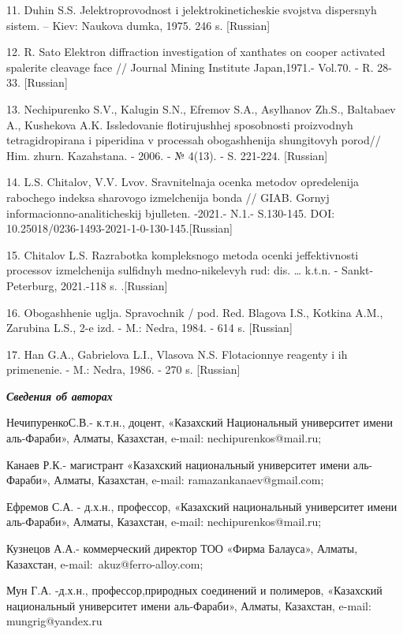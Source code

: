 \begin{noparindent}
11. Duhin S.S. Jelektroprovodnost\textquotesingle{} i
jelektrokineticheskie svojstva dispersnyh sistem. -- Kiev: Naukova
dumka, 1975. 246 s. {[}Russian{]}

12. R. Sato Elektron diffraction investigation of xanthates on cooper
activated spalerite cleavage face // Journal Mining Institute
Japan,1971.- Vol.70. - R. 28-33. {[}Russian{]}

13. Nechipurenko S.V., Kalugin S.N., Efremov S.A., Asylhanov Zh.S.,
Baltabaev A., Kushekova A.K. Issledovanie flotirujushhej sposobnosti
proizvodnyh tetragidropirana i piperidina v processah obogashhenija
shungitovyh porod// Him. zhurn. Kazahstana. - 2006. - № 4(13). - S.
221-224. {[}Russian{]}

14. L.S. Chitalov, V.V. L\textquotesingle vov.
Sravnitel\textquotesingle naja ocenka metodov opredelenija rabochego
indeksa sharovogo izmel\textquotesingle chenija bonda // GIAB. Gornyj
informacionno-analiticheskij bjulleten\textquotesingle. -2021.- N.1.-
S.130-145. DOI: 10.25018/0236-1493-2021-1-0-130-145.{[}Russian{]}

15. Chitalov L.S. Razrabotka kompleksnogo metoda ocenki jeffektivnosti
processov izmel\textquotesingle chenija sul\textquotesingle fidnyh
medno-nikelevyh rud: dis. \ldots{} k.t.n. - Sankt-Peterburg, 2021.-118
s. .{[}Russian{]}

16. Obogashhenie uglja. Spravochnik / pod. Red. Blagova I.S., Kotkina
A.M., Zarubina L.S., 2-e izd. - M.: Nedra, 1984. - 614 s. {[}Russian{]}

17. Han G.A., Gabrielova L.I., Vlasova N.S. Flotacionnye reagenty i ih
primenenie. - M.: Nedra, 1986. - 270 s. {[}Russian{]}
\end{noparindent}

\emph{{\bfseries Сведения об авторах}}

\begin{noparindent}
НечипуренкоС.В.- к.т.н., доцент, «Казахский Национальный университет
имени аль-Фараби», Алматы, Казахстан, e-mail: nechipurenkos@mail.ru;

Канаев Р.К.- магистрант «Казахский национальный университет имени
аль-Фараби», Алматы, Казахстан, e-mail: ramazankanaev@gmail.com;

Ефремов С.А. - д.х.н., профессор, «Казахский национальный университет
имени аль-Фараби», Алматы, Казахстан, e-mail: nechipurenkos@mail.ru;

Кузнецов А.А.- коммерческий директор ТОО «Фирма Балауса», Алматы,
Казахстан, e-mail:~akuz@ferro-alloy.com;

Мун Г.А. -д.х.н., профессор,природных соединений и полимеров, «Казахский
национальный университет имени аль-Фараби», Алматы, Казахстан, e-mail:
mungrig@yandex.ru
\end{noparindent}

